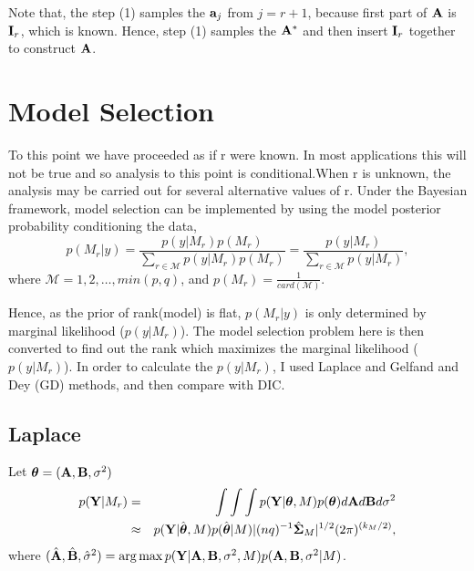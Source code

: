 \documentclass[]{book}
\begin{document}
Note that, the step (1) samples the \({\bf a}_j\) from \(j=r+1\), because first part of \({\bf A}\) is \({\bf I}_r\), which is
known. Hence, step (1) samples the \({\bf A}^*\) and then insert \({\bf I}_r\) together to construct \({\bf A}\).

\hypertarget{model-selection}{%
\section{Model Selection}\label{model-selection}}

To this point we have proceeded as if r were known. In most applications this will not be
true and so analysis to this point is conditional.When r is unknown, the analysis may be carried out for several alternative values of r. Under the Bayesian framework, model selection can be implemented by using the model posterior probability conditioning the data,
\[
    p(M_r|y)=\frac{p(y|M_r)p(M_r)}{\sum_{r\in \mathcal{M}}p(y|M_r)p(M_r)}=
    \frac{p(y|M_r)}{\sum_{r\in \mathcal{M}}p(y|M_r)},
\]
where \(\mathcal{M}={1,2,\ldots,min(p,q)}\), and \(p(M_r)=\frac{1}{card(\mathcal{M})}\).

Hence, as the prior of rank(model) is flat, \(p(M_r|y)\) is only determined by marginal likelihood (\(p(y|M_r)\)). The model selection problem here is then converted to find out the rank which maximizes the marginal likelihood (\(p(y|M_r)\)). In order to calculate the \(p(y|M_r)\), I used Laplace and Gelfand and Dey (GD) methods, and then compare with DIC.

\hypertarget{laplace}{%
\subsection{Laplace}\label{laplace}}

Let \({\boldsymbol \theta}= ({\bf A},{\bf B},\sigma^2)\)
\begin{eqnarray*}
        p({\bf Y}|M_r) &=& \int \int \int p({\bf Y}|{\boldsymbol \theta},M)p({\boldsymbol \theta}) d{{\bf A}}d{{\bf B}}d{\sigma^2}\\
        &\approx& p({\bf Y}|\hat{{\boldsymbol \theta}},M)p(\hat{\boldsymbol \theta}|M)|(nq)^{-1}\hat{\boldsymbol \Sigma}_M|^{1/2} (2\pi)^{(k_M/2)},
\end{eqnarray*}
where \((\hat{\bf A},\hat{\bf B},\hat\sigma^2)=\arg \max p({\bf Y}|{{\bf A}},{{\bf B}},{\sigma^2},M)p({\bf A},{\bf B},\sigma^2|M)\).
\end{document}
